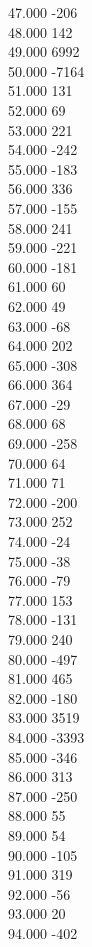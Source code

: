 { 47.000	-206 \\
 48.000	142 \\
 49.000	6992 \\
 50.000	-7164 \\
 51.000	131 \\
 52.000	69 \\
 53.000	221 \\
 54.000	-242 \\
 55.000	-183 \\
 56.000	336 \\
 57.000	-155 \\
 58.000	241 \\
 59.000	-221 \\
 60.000	-181 \\
 61.000	60 \\
 62.000	49 \\
 63.000	-68 \\
 64.000	202 \\
 65.000	-308 \\
 66.000	364 \\
 67.000	-29 \\
 68.000	68 \\
 69.000	-258 \\
 70.000	64 \\
 71.000	71 \\
 72.000	-200 \\
 73.000	252 \\
 74.000	-24 \\
 75.000	-38 \\
 76.000	-79 \\
 77.000	153 \\
 78.000	-131 \\
 79.000	240 \\
 80.000	-497 \\
 81.000	465 \\
 82.000	-180 \\
 83.000	3519 \\
 84.000	-3393 \\
 85.000	-346 \\
 86.000	313 \\
 87.000	-250 \\
 88.000	55 \\
 89.000	54 \\
 90.000	-105 \\
 91.000	319 \\
 92.000	-56 \\
 93.000	20 \\
 94.000	-402 \\
}
